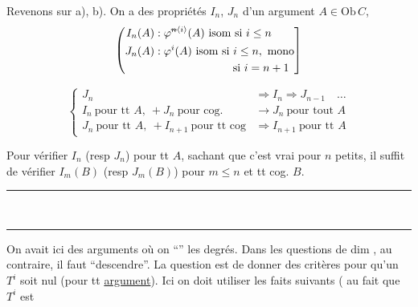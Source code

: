 Revenons sur a), b). On a des propriétés  $I_n$, $J_n$ d'un argument $A\in\mathrm{Ob}\,C$,
\[
\left(\begin{aligned}
 I_n(A)&:\varphi^{\deleted{n}\inserted{i}}(A)\ \text{isom si }i\le n\\
 J_n(A)&:\varphi^i(A)\ \text{isom si }i\le n,\ \text{mono}\\
 &\hspace{7em}\text{si }i=n+1
\end{aligned}\right]
\]

\[
\left\{\begin{aligned}
 J_n&\Rightarrow I_n\Rightarrow J_{n-1}\quad\ldots\\
 I_n\ \text{pour tt }A,\ +J_n\ \text{pour cog.}&\to J_n\ \text{pour tout } A\\
 J_n\ \text{pour tt }A,\ +I_{n+1}\ \text{pour tt cog}&\Rightarrow I_{n+1}\ \text{pour tt }A
\end{aligned}\right.
\]

\uline{} Pour vérifier $I_n$ (resp $J_n$) pour tt $A$, sachant que c'est vrai pour $n$ petits, il suffit de vérifier $I_m(B)$ (resp $J_m(B)$) pour $m\le n$ et tt cog. $B$.

\rule{3cm}{0.4pt}\\[-1.5ex]\rule{3cm}{0.4pt}

On avait ici des arguments où on ``'' les degrés. Dans les questions de dim , au contraire, il faut ``descendre''. La question est de donner des critères pour qu'un $T^i$ soit nul (pour tt \uline{argument}). Ici on doit utiliser les faits suivants ( au fait que $T^i$ est





